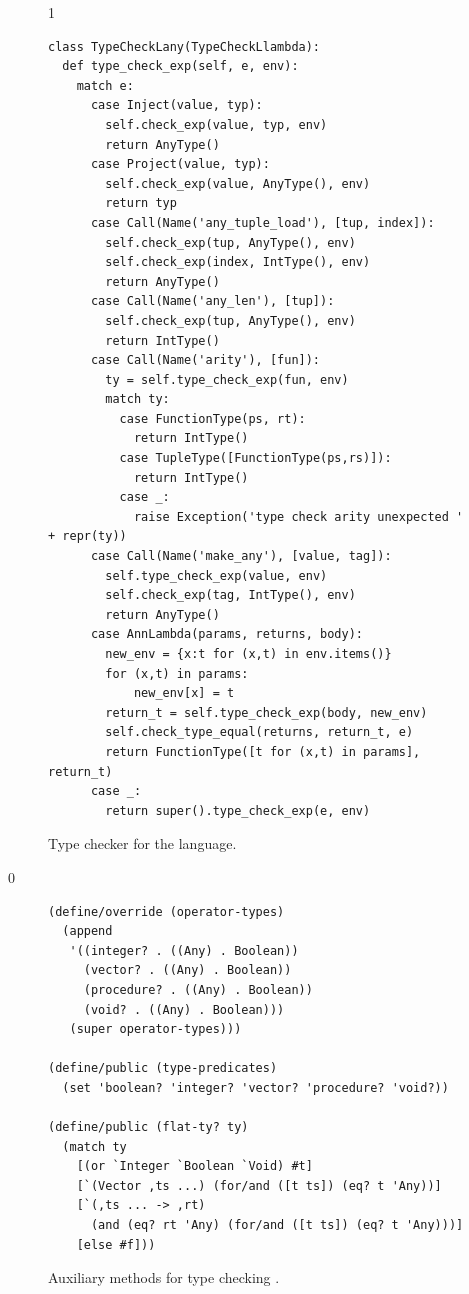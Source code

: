 \documentclass[7x10]{TimesAPriori_MIT}%
\def\racketEd{0}
\def\pythonEd{1}
\def\edition{1}
\newcommand{\pythonColor}[0]{}
\numberwithin{theorem}{chapter}
\numberwithin{definition}{chapter}
\numberwithin{equation}{chapter}
\begin{document}
\begin{figure}[btp]
\begin{tcolorbox}[colback=white]
{\fi}
{\if\edition\pythonEd\pythonColor
\begin{lstlisting}
class TypeCheckLany(TypeCheckLlambda):
  def type_check_exp(self, e, env):
    match e:
      case Inject(value, typ):
        self.check_exp(value, typ, env)
        return AnyType()
      case Project(value, typ):
        self.check_exp(value, AnyType(), env)
        return typ
      case Call(Name('any_tuple_load'), [tup, index]):
        self.check_exp(tup, AnyType(), env)
        self.check_exp(index, IntType(), env)
        return AnyType()
      case Call(Name('any_len'), [tup]):
        self.check_exp(tup, AnyType(), env)
        return IntType()
      case Call(Name('arity'), [fun]):
        ty = self.type_check_exp(fun, env)
        match ty:
          case FunctionType(ps, rt):
            return IntType()
          case TupleType([FunctionType(ps,rs)]):
            return IntType()
          case _:
            raise Exception('type check arity unexpected ' + repr(ty))
      case Call(Name('make_any'), [value, tag]):
        self.type_check_exp(value, env)
        self.check_exp(tag, IntType(), env)
        return AnyType()
      case AnnLambda(params, returns, body):
        new_env = {x:t for (x,t) in env.items()}
        for (x,t) in params:
            new_env[x] = t
        return_t = self.type_check_exp(body, new_env)
        self.check_type_equal(returns, return_t, e)
        return FunctionType([t for (x,t) in params], return_t)
      case _:
        return super().type_check_exp(e, env)
\end{lstlisting}
\fi}
  \end{tcolorbox}

  \caption{Type checker for the \LangAny{} language.}
\label{fig:type-check-Lany}
\end{figure}

{\if\edition\racketEd
\begin{figure}[tbp]
  \begin{tcolorbox}[colback=white]
\begin{lstlisting}
(define/override (operator-types)
  (append
   '((integer? . ((Any) . Boolean))
     (vector? . ((Any) . Boolean))
     (procedure? . ((Any) . Boolean))
     (void? . ((Any) . Boolean)))
   (super operator-types)))

(define/public (type-predicates)
  (set 'boolean? 'integer? 'vector? 'procedure? 'void?))

(define/public (flat-ty? ty)
  (match ty
    [(or `Integer `Boolean `Void) #t]
    [`(Vector ,ts ...) (for/and ([t ts]) (eq? t 'Any))]
    [`(,ts ... -> ,rt)
      (and (eq? rt 'Any) (for/and ([t ts]) (eq? t 'Any)))]
    [else #f]))
\end{lstlisting}
\end{tcolorbox}

\caption{Auxiliary methods for type checking \LangAny{}.}
\label{fig:type-check-Lany-aux}
\end{figure}
\fi}
\end{document}
